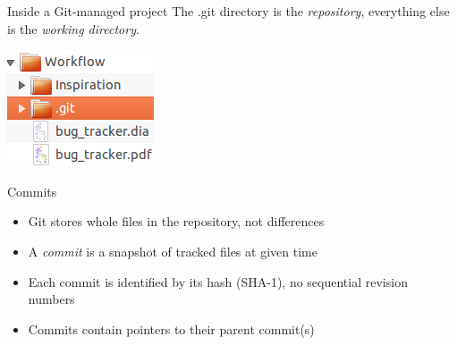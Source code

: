 \documentclass{beamer}
\begin{document}
\begin{frame}{Inside a Git-managed project}
The .git directory is the \emph{repository}, everything else is the \emph{working directory}.
  \begin{center}
    \includegraphics{images/directory_structure.png}
  \end{center}
\end{frame}

\begin{frame}{Commits}
  \begin{center}
  \end{center}
  \begin{itemize}
  \item Git stores whole files in the repository, not differences
  \item A \emph{commit} is a snapshot of tracked files at given time
  \item Each commit is identified by its hash (SHA-1), no sequential revision numbers
  \item Commits contain pointers to their parent commit(s)
  \end{itemize}
\end{frame}
\end{document}
